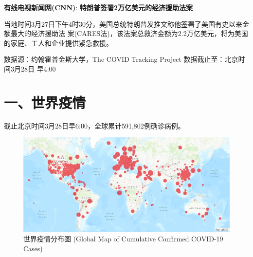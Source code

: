 \documentclass[11,]{article}
\begin{document}
\textbf{\textcolor{glaucous}{有线电视新闻网(CNN)}}:
\textbf{特朗普签署2万亿美元的经济援助法案}

当地时间3月27日下午4时30分，美国总统特朗普发推文称他签署了美国有史以来金额最大的经济援助法
案(CARES法)，该法案总救济金额为2.2万亿美元，将为美国的家庭、工人和企业提供紧急救援。

%
  \noindent{}%

数据源：约翰霍普金斯大学，The COVID Tracking Project
数据截止至：北京时间3月28日 早4:00

\hypertarget{section-1}{%
\section{\texorpdfstring{\textcolor{glaucous}{一、世界疫情}}{}}\label{section-1}}

截止北京时间3月28日早6:00，全球累计591,802例确诊病例。

\begin{figure}[htbp] 
\centering %
\includegraphics[]{./test/covid1.png} %
\caption{世界疫情分布图 (Global Map of Cumulative Confirmed COVID-19 Cases)} %
\label{} %
\end{figure}

\begin{table}[]
\caption{累计确诊前十位国家}
\centering
{}
\end{table}
\end{document}
